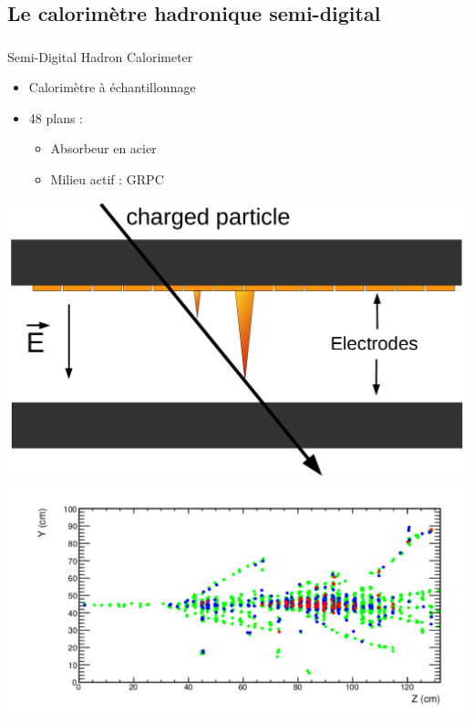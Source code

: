 \documentclass[8pt]{beamer}
\begin{document}
  \subsection{Le calorimètre hadronique semi-digital}

  \begin{frame}
  \frametitle{\secname}
  \framesubtitle{\subsecname}
  \begin{minipage}{0.4\linewidth}
    \begin{block}{Semi-Digital Hadron Calorimeter}
      \begin{itemize}
        \item Calorimètre à échantillonnage
        \item 48 plans :
        \begin{itemize}
          \item Absorbeur en acier
          \item Milieu actif : GRPC
        \end{itemize}
      \end{itemize}
    \end{block}
    \vspace{0.1cm}
   \centering \includegraphics[width=\linewidth]{figs/RpcAvalanche.pdf} \\
   \centering \includegraphics[width=\linewidth]{figs/sdhcal_pion_80GeV.pdf}

\end{minipage}
\end{frame}
\end{document}
